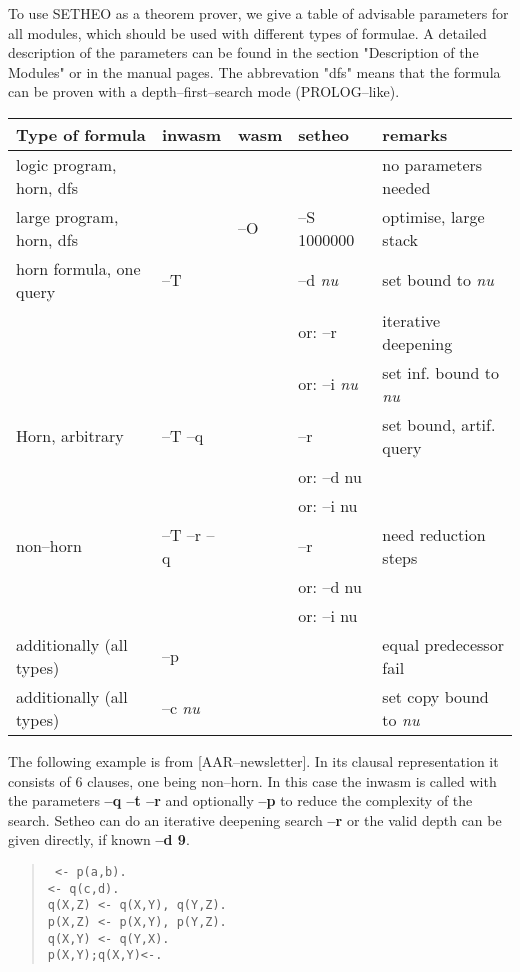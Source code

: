 To use SETHEO as a theorem prover, we give a table of
advisable parameters for all modules, which should be used
with different types of formulae.
A detailed description of the parameters can be found in the section
"Description of the Modules" or in the manual pages.
The abbrevation "dfs" means that the formula can be proven with a
depth--first--search mode (PROLOG--like).

\begin{center}
\begin{tabular}{|l|l|l|l|l|}
\hline
Type of formula & inwasm & wasm & setheo  & remarks\\
\hline \hline
logic program, horn, dfs & & & & no parameters needed\\
\hline
large program, horn, dfs & & --O & --S 1000000 & optimise, large stack \\
\hline
horn formula, one query & --T & & --d {\it nu\/} & set bound to {\it nu\/}\\
&&& or: --r & iterative deepening\\
&&& or: --i {\it nu\/} & set inf. bound to {\it nu\/}\\
\hline
Horn, arbitrary & --T --q & & --r & set bound, artif. query \\
&&& or: --d nu &\\
&&& or: --i nu &\\
\hline
non--horn & --T --r --q & & --r & need reduction steps \\
&&& or: --d nu &\\
&&& or: --i nu &\\
\hline
\hline
additionally (all types)& --p & & & equal predecessor fail\\
\hline
additionally (all types)& --c {\it nu\/}& & & set copy bound to {\it nu\/}\\
\hline
\end{tabular}
\end{center}
\vspace{3mm}

The following example is from [AAR--newsletter]. In its clausal representation
it consists of 6 clauses, one being non--horn. In this case the inwasm
is called with the parameters {\bf --q --t --r} and optionally {\bf --p}
to reduce the complexity of the search. Setheo can do an iterative deepening
search {\bf --r} or the valid depth can be given directly, if known {\bf --d 9}.

\begin{center}
\begin{quote}
{\tt
<- p(a,b). \\
<- q(c,d). \\
q(X,Z) <- q(X,Y), q(Y,Z). \\
p(X,Z) <- p(X,Y), p(Y,Z). \\
q(X,Y) <- q(Y,X). \\
p(X,Y);q(X,Y)<-. \\
}
\end{quote}
\end{center}
